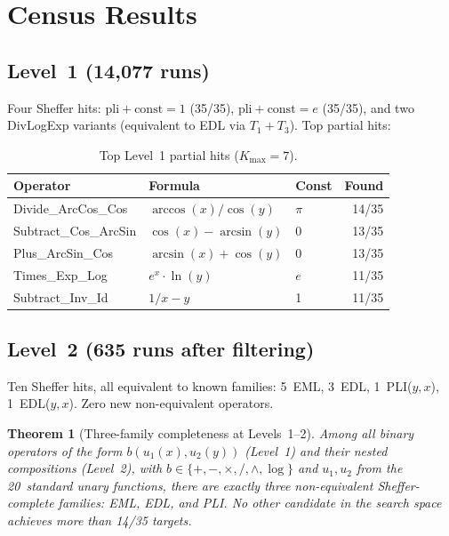 \documentclass[10pt,twocolumn]{article}
\newtheorem{theorem}{Theorem}
\theoremstyle{remark}
\begin{document}
\section{Census Results}

\subsection{Level~1 (14{,}077 runs)}
Four Sheffer hits: $\mathrm{pli} + \text{const}=1$ (35/35), $\mathrm{pli} + \text{const}=e$ (35/35), and two DivLogExp variants (equivalent to EDL via $T_1 + T_3$). Top partial hits:

\begin{table}[h]
\centering
\small
\begin{tabular}{lllr}
\toprule
Operator & Formula & Const & Found\\
\midrule
Divide\_ArcCos\_Cos & $\arccos(x)/\cos(y)$ & $\pi$ & 14/35\\
Subtract\_Cos\_ArcSin & $\cos(x) - \arcsin(y)$ & 0 & 13/35\\
Plus\_ArcSin\_Cos & $\arcsin(x) + \cos(y)$ & 0 & 13/35\\
Times\_Exp\_Log & $e^x \cdot \ln(y)$ & $e$ & 11/35\\
Subtract\_Inv\_Id & $1/x - y$ & 1 & 11/35\\
\bottomrule
\end{tabular}
\caption{Top Level~1 partial hits ($K_{\max} = 7$).}
\end{table}

\subsection{Level~2 (635 runs after filtering)}
Ten Sheffer hits, all equivalent to known families: 5~EML, 3~EDL, 1~PLI($y,x$), 1~EDL($y,x$). Zero new non-equivalent operators.

\begin{theorem}[Three-family completeness at Levels~1--2]\label{thm:threefamily}
Among all binary operators of the form $b(u_1(x), u_2(y))$ (Level~1) and their nested compositions (Level~2), with $b \in \{+,-,\times,/,\wedge,\log\}$ and $u_1, u_2$ from the 20~standard unary functions, there are exactly three non-equivalent Sheffer-complete families: EML, EDL, and PLI. No other candidate in the search space achieves more than 14/35 targets.
\end{theorem}
\end{document}
